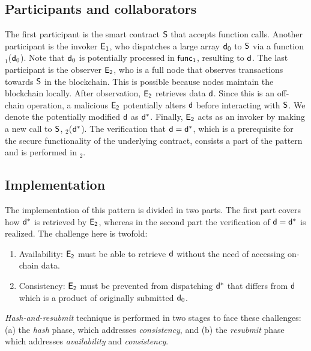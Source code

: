 \subsection{Participants and collaborators} The first participant is the
smart contract $\mathsf{S}$ that accepts function calls. Another participant is
the invoker $\mathsf{E_{1}}$, who dispatches a large array $\mathsf{d}_0$ to $\mathsf{S}$
via a function \texttt{\proc$_1$}($\mathsf{d}_0$). Note that $\mathsf{d}_0$ is
potentially processed in $\textsf{func}_1$, resulting to $\mathsf{d}$. The last participant
is the observer $\mathsf{E_{2}}$, who is a full node that observes transactions
towards $\mathsf{S}$ in the blockchain. This is possible because nodes maintain
the blockchain locally. After observation, $\mathsf{E_{2}}$ retrieves data $\mathsf{d}$.
Since this is an off-chain operation, a malicious $\mathsf{E_{2}}$ potentially
alters $\mathsf{d}$ before interacting with $\mathsf{S}$. We denote the
potentially modified $\mathsf{d}$ as $\mathsf{d^*}$. Finally, $\mathsf{E_{2}}$ acts as an
invoker by making a new call to $\mathsf{S}$, \texttt{\proc$_2$}($\mathsf{d^*}$). The
verification that $\mathsf{d} = \mathsf{d^*}$, which is a prerequisite for the secure
functionality of the underlying contract, consists a part of the pattern and is
performed in \texttt{\proc$_2$}.

\subsection{Implementation} The implementation of this pattern is
divided in two parts. The first part covers how $\mathsf{d^*}$ is retrieved by
$\mathsf{E_{2}}$, whereas in the second part the verification of $\mathsf{d}=\mathsf{d^*}$ is
realized. The challenge here is twofold:

\begin{enumerate}

    \item Availability: $\mathsf{E_{2}}$ must be able to retrieve $\mathsf{d}$ without
        the need of accessing on-chain data.

    \item Consistency: $\mathsf{E_{2}}$ must be prevented from dispatching $\mathsf{d^*}$
        that differs from $\mathsf{d}$ which is a product of originally submitted
        $\mathsf{d}_0$.

\end{enumerate}

\emph{Hash-and-resubmit} technique is performed in two
stages to face these challenges: (a) the \emph{hash} phase, which addresses
\emph{consistency}, and (b) the \emph{resubmit} phase which addresses
\emph{availability} and \emph{consistency}.

